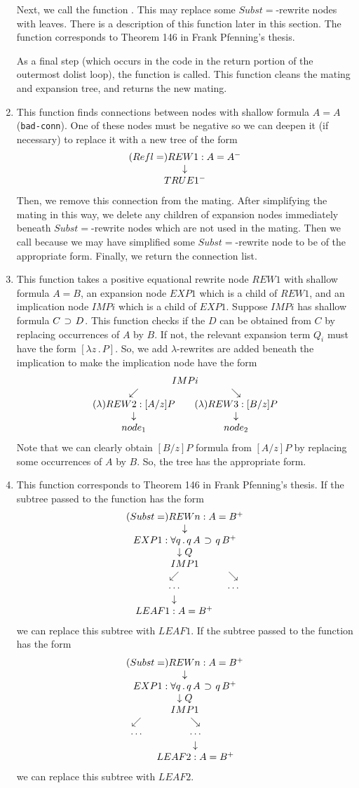 \begin{enumerate}
Next, we call the function .
This may replace some $Subst=$-rewrite nodes with leaves.
There is a description of this function later in this
section.  The function corresponds to Theorem 146
in Frank Pfenning's thesis\cite{Pfenning86}.

As a final step (which occurs in the code in the return
portion of the outermost dolist loop), the
function 
is called.  This function cleans the mating and expansion
tree, and returns the new mating.

\item {\bf{}}
This function finds connections between nodes with shallow
formula $A=A$ (\verb+bad-conn+).  One of these nodes must be negative
so we can deepen it (if necessary)
to replace it with a new tree of the form
$$\erew{1}{Refl=}{A=A^-}{\truenode{1^-}}$$
Then, we remove this connection from the mating.
After simplifying the mating in this way,
we delete any children of expansion nodes immediately beneath
$Subst=$-rewrite nodes which are
not used in the mating.
Then we call 
because we may have simplified some $Subst=$-rewrite
node to be of the appropriate form.
Finally, we return the connection list.

\item {\bf{}}
This function takes a positive equational rewrite node
$REW1$ with shallow formula
$A = B$, an expansion node 
$EXP1$ which is a child of $REW1$, and an implication node $IMPi$ which is a child
of $EXP1$.  Suppose $IMPi$ has shallow formula
$C\, \limplies\, D$.  
This function checks if the $D$ can be obtained from $C$
by replacing occurrences of $A$ by $B$.
If not, the relevant expansion term $Q_i$ must
have the form $[\lambda z\, . \, P]$.
So, we add
$\lambda$-rewrites are added beneath the implication
to make the implication node have the form
$$\eimp{i}{[A/z]P\, \limplies \, [B/z]P}
{\erew{2}{\lambda}{[A/z]P}{node_1}}
{\erew{3}{\lambda}{[B/z]P}{node_2}}$$
Note that we can clearly obtain $[B/z]P$
formula from $[A/z]P$ by replacing some occurrences
of $A$ by $B$.  So, the tree has the appropriate form.

\item {\bf{}}
This function corresponds to Theorem 146 in Frank Pfenning's
thesis\cite{Pfenning86}.  
If the subtree passed to the function has
the form
$$\erew{n}{Subst=}{A = B^+}
{\uexpnode{1}{\forall q\, . \, q\, A \, \limplies\, q\, B^+}
{Q}{\eimp{1}{C\, \limplies \, D^+}
{\etrgap{\eleaf{1}{A=B^+}}}
{\cdots}}}$$
we can replace this subtree with $LEAF1$.
If the subtree passed to the function has
the form
$$\erew{n}{Subst=}{A = B^+}
{\uexpnode{1}{\forall q\, . \, q\, A \, \limplies\, q\, B^+}
{Q}{\eimp{1}{C\, \limplies \, D^+}
{\cdots}
{\etrgap{\eleaf{2}{A=B^+}}}}}$$
we can replace this subtree with $LEAF2$.
\end{enumerate}

